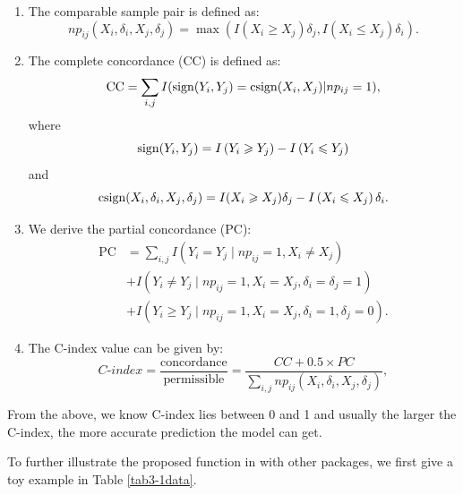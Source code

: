 \begin{enumerate}[label=(\alph*)]
  \item The comparable sample pair is defined as:
\begin{equation}\label{compairs}
  np_{ij}\left(X_{i}, \delta_{i}, X_{j}, \delta_{j}\right) = \max(I\left(X_{i} \geqslant X_{j}\right) \delta_{j},I\left(X_{i} \leqslant X_{j}\right) \delta_{i}).
\end{equation}
  \item The complete concordance (CC) is defined as:
\begin{equation}\label{CC}
  \text{CC} = \sum_{i,j}I({\rm sign}(Y_i,Y_j)={\rm csign}(X_i,X_j)|np_{ij}=1),
\end{equation}
where
\begin{equation}\label{sign}
  {\rm sign}(Y_i,Y_j) = I\left(Y_{i} \geqslant Y_{j}\right) -I\left(Y_{i} \leqslant Y_{j}\right)
\end{equation}
and
\begin{equation}\label{csign}
  {\rm csign}(X_{i}, \delta_{i}, X_{j}, \delta_{j})=I(X_{i} \geqslant X_{j}) \delta_{j}-I\left(X_{i} \leqslant X_{j}\right) \delta_{i}.
\end{equation}
  \item We derive the partial concordance (PC):
\begin{equation}\label{PC}
\begin{aligned}
\text{PC} &=\sum_{i, j} I\left(Y_{i}=Y_{j} \mid n p_{i j}=1, X_{i} \neq X_{j}\right) \\
&+I\left(Y_{i} \neq Y_{j} \mid n p_{i j}=1, X_{i}=X_{j}, \delta_{i}=\delta_{j}=1\right) \\
&+I\left(Y_{i} \geq Y_{j} \mid n p_{i j}=1, X_{i}=X_{j}, \delta_{i}=1, \delta_{j}=0\right).
\end{aligned}
\end{equation}
  \item The C-index value can be given by:
\begin{equation}\label{CI}
  C\text{-}index =\frac{\text{concordance}}{\text{permissible}} = \frac{CC+0.5\times PC}{\sum_{i,j}np_{ij}(X_i,\delta_i,X_j,\delta_j)},
\end{equation}
\end{enumerate}


From the above, we know C-index lies between 0 and 1 and usually the larger the C-index, the more accurate prediction the model can get.

To further illustrate the proposed  function in  with other packages, we first give a toy example in Table \ref{tab3-1data}.

